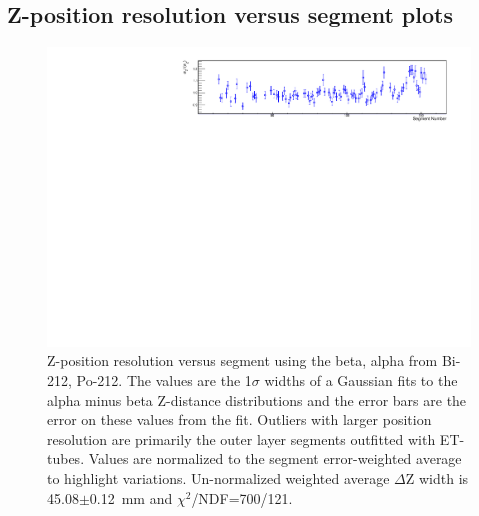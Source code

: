 \subsection{Z-position resolution versus segment plots}
\begin{figure}[!h]
\centering
\includegraphics[width=1.05\textwidth]{figures/PubBiPo212dZWidthvsCell.pdf}
\caption{\label{fig:ZresvsCell212}Z-position resolution versus segment using the beta, alpha from Bi-212, Po-212. The values are the 1$\sigma$ widths of a Gaussian fits to the alpha minus beta Z-distance distributions and the error bars are the error on these values from the fit. Outliers with larger position resolution are primarily the outer layer segments outfitted with ET-tubes. Values are normalized to the segment error-weighted average to highlight variations. Un-normalized weighted average $\Delta$Z width is 45.08$\pm$0.12~mm and $\chi^2$/NDF=700/121.}
\end{figure}
